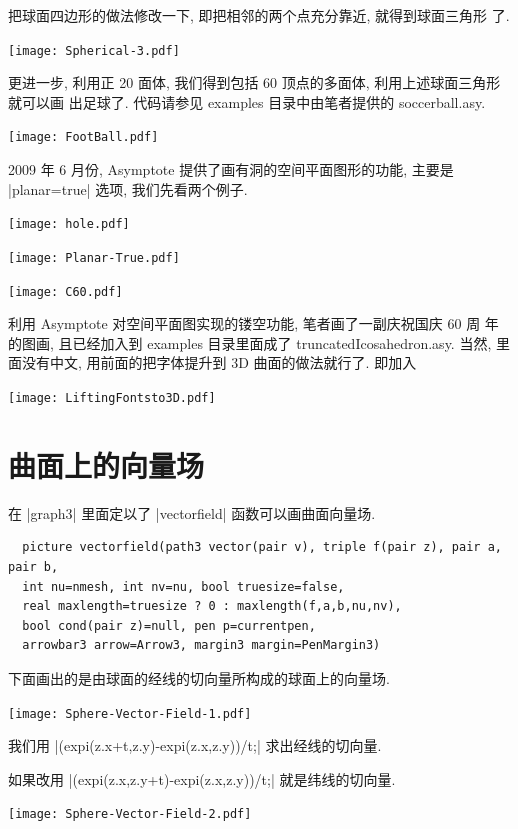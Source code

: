 \documentclass[nofonts,CJKnormalspaces]{ctexbook}[2009/05/20]
\begin{document}
把球面四边形的做法修改一下, 即把相邻的两个点充分靠近, 就得到球面三角形
了.
\begin{center}\texttt{[image: Spherical-3.pdf]}\end{center}%

更进一步, 利用正 20 面体, 我们得到包括 60 顶点的多面体, 利用上述球面三角形就可以画
出足球了. 代码请参见 examples 目录中由笔者提供的 soccerball.asy.
\begin{center}\texttt{[image: FootBall.pdf]}\end{center}%

2009 年 6 月份, Asymptote 提供了画有洞的空间平面图形的功能, 主要是
|planar=true| 选项, 我们先看两个例子.
\begin{center}\texttt{[image: hole.pdf]}\end{center}%

\begin{center}\texttt{[image: Planar-True.pdf]}\end{center}%

\begin{center}\texttt{[image: C60.pdf]}\end{center}%
利用 Asymptote 对空间平面图实现的镂空功能, 笔者画了一副庆祝国庆 60 周
年的图画, 且已经加入到 examples 目录里面成了
truncatedIcosahedron.asy. 当然, 里面没有中文, 用前面的把字体提升到 3D
曲面的做法就行了. 即加入

\begin{center}\texttt{[image: LiftingFontsto3D.pdf]}\end{center}%
% 
\section{曲面上的向量场}
在 |graph3| 里面定以了 |vectorfield| 函数可以画曲面向量场.
\begin{lstlisting}
  picture vectorfield(path3 vector(pair v), triple f(pair z), pair a, pair b,
  int nu=nmesh, int nv=nu, bool truesize=false,
  real maxlength=truesize ? 0 : maxlength(f,a,b,nu,nv),
  bool cond(pair z)=null, pen p=currentpen,
  arrowbar3 arrow=Arrow3, margin3 margin=PenMargin3)
\end{lstlisting}
下面画出的是由球面的经线的切向量所构成的球面上的向量场.
\begin{center}\texttt{[image: Sphere-Vector-Field-1.pdf]}\end{center}%

我们用 |(expi(z.x+t,z.y)-expi(z.x,z.y))/t;| 求出经线的切向量.


如果改用 |(expi(z.x,z.y+t)-expi(z.x,z.y))/t;| 就是纬线的切向量.
\begin{center}\texttt{[image: Sphere-Vector-Field-2.pdf]}\end{center}%
\end{document}
